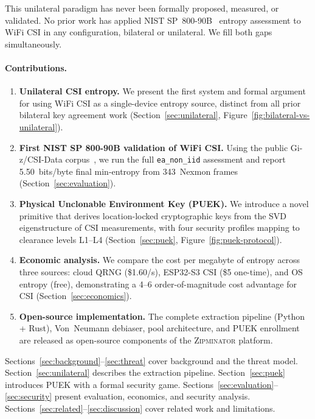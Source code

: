 \documentclass[sigconf,nonacm=false]{acmart}
\newcommand{\zipminator}{\textsc{Zipminator}\xspace}
\begin{document}
This unilateral paradigm has never been formally proposed, measured, or validated.
No prior work has applied NIST SP~800-90B~\cite{nist2018sp80090b} entropy assessment to WiFi CSI in any configuration, bilateral or unilateral.
We fill both gaps simultaneously.

\paragraph{Contributions.}
\begin{enumerate}
\item \textbf{Unilateral CSI entropy.}
We present the first system and formal argument for using WiFi CSI as a single-device entropy source, distinct from all prior bilateral key agreement work (Section~\ref{sec:unilateral}, Figure~\ref{fig:bilateral-vs-unilateral}).

\item \textbf{First NIST SP 800-90B validation of WiFi CSI.}
Using the public Gi-z/CSI-Data corpus~\cite{gringoli2019csidata}, we run the full \texttt{ea\_non\_iid} assessment and report 5.50~bits/byte final min-entropy from 343~Nexmon frames (Section~\ref{sec:evaluation}).

\item \textbf{Physical Unclonable Environment Key (PUEK).}
We introduce a novel primitive that derives location-locked cryptographic keys from the SVD eigenstructure of CSI measurements, with four security profiles mapping to clearance levels L1--L4 (Section~\ref{sec:puek}, Figure~\ref{fig:puek-protocol}).

\item \textbf{Economic analysis.}
We compare the cost per megabyte of entropy across three sources: cloud QRNG (\$1.60/s), ESP32-S3 CSI (\$5 one-time), and OS entropy (free), demonstrating a 4--6 order-of-magnitude cost advantage for CSI (Section~\ref{sec:economics}).

\item \textbf{Open-source implementation.}
The complete extraction pipeline (Python + Rust), Von~Neumann debiaser, pool architecture, and PUEK enrollment are released as open-source components of the \zipminator platform.
\end{enumerate}

\noindent
Sections~\ref{sec:background}--\ref{sec:threat} cover background and the threat model.
Section~\ref{sec:unilateral} describes the extraction pipeline.
Section~\ref{sec:puek} introduces PUEK with a formal security game.
Sections~\ref{sec:evaluation}--\ref{sec:security} present evaluation, economics, and security analysis.
Sections~\ref{sec:related}--\ref{sec:discussion} cover related work and limitations.
\end{document}
